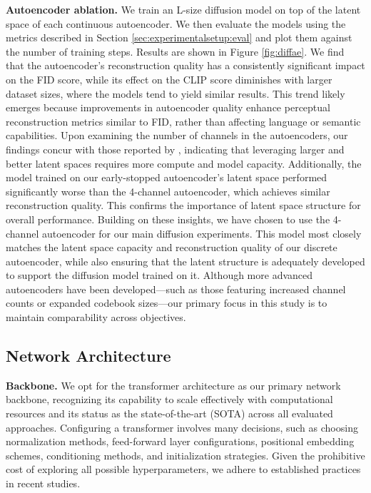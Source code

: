 \aereconstructiontable

\textbf{Autoencoder ablation.} We train an L-size diffusion model on top of the latent space of each continuous autoencoder. We then evaluate the models using the metrics described in Section \ref{sec:experimentalsetup:eval} and plot them against the number of training steps. Results are shown in Figure \ref{fig:diffae}. We find that the autoencoder's reconstruction quality has a consistently significant impact on the FID score, while its effect on the CLIP score diminishes with larger dataset sizes, where the models tend to yield similar results. This trend likely emerges because improvements in autoencoder quality enhance perceptual reconstruction metrics similar to FID, rather than affecting language or semantic capabilities. Upon examining the number of channels in the autoencoders, our findings concur with those reported by \cite{esser2024scaling}, indicating that leveraging larger and better latent spaces requires more compute and model capacity. Additionally, the model trained on our early-stopped autoencoder's latent space performed significantly worse than the 4-channel autoencoder, which achieves similar reconstruction quality. This confirms the importance of latent space structure for overall performance.
Building on these insights, we have chosen to use the 4-channel autoencoder for our main diffusion experiments. This model most closely matches the latent space capacity and reconstruction quality of our discrete autoencoder, while also ensuring that the latent structure is adequately developed to support the diffusion model trained on it. Although more advanced autoencoders have been developed—such as those featuring increased channel counts or expanded codebook sizes—our primary focus in this study is to maintain comparability across objectives.

\diffae

\subsection{Network Architecture}
\label{experimentalsetup:networkarch}
\textbf{Backbone.} We opt for the transformer architecture as our primary network backbone, recognizing its capability to scale effectively with computational resources and its status as the state-of-the-art (SOTA) across all evaluated approaches. Configuring a transformer involves many decisions, such as choosing normalization methods, feed-forward layer configurations, positional embedding schemes, conditioning methods, and initialization strategies. Given the prohibitive cost of exploring all possible hyperparameters, we adhere to established practices in recent studies.

